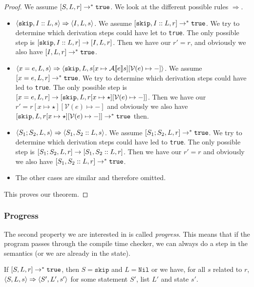 \begin{proof}
We assume $[ S, L, r ] \to ^* \texttt{true}$. We look at the different possible rules $\Rightarrow$. 
\begin{itemize}[noitemsep]
    \item $\langle \texttt{skip}, I::L, s \rangle \Rightarrow \langle I, L, s \rangle$. We assume $[ \texttt{skip}, I::L, r ] \to ^* \texttt{true}$. We try to determine which derivation steps could have let to \texttt{true}. The only possible step is $[ \texttt{skip}, I::L, r ]\to [ I, L, r ]$. Then we have our $r' = r$, and obviously we also have $[ I, L, r ] \to^* \texttt{true}$.
    
    \item $\langle x = e, L, s \rangle \Rightarrow \langle \texttt{skip}, L, s[x \mapsto \mathcal{A} \llbracket e \rrbracket s][\mathcal{V}(e)\mapsto-] \rangle$. We assume $[ x = e, L, r ] \to ^* \texttt{true}$. We try to determine which derivation steps could have led to \texttt{true}. The only possible step is $[ x=e, L, r ] \to [ \texttt{skip}, L, r[x\mapsto \star][\mathcal{V}(e) \mapsto -] ]$. Then we have our $r' = r[x\mapsto \star][\mathcal{V}(e) \mapsto -]$ and obviously we also have $[ \texttt{skip}, L, r[x\mapsto \star][\mathcal{V}(e) \mapsto -] ] \to^* \texttt{true}$ then.
    
    \item $\langle S_1; S_2, L, s \rangle \Rightarrow \langle S_1, S_2::L, s \rangle$. We assume $[ S_1; S_2, L, r ] \to ^* \texttt{true}$. We try to determine which derivation steps could have led to \texttt{true}. The only possible step is $[ S_1; S_2, L, r ] \to [ S_1, S_2::L, r ]$. Then we have our $r' = r$ and obviously we also have $[ S_1, S_2::L, r ] \to^* \texttt{true}$.
    \item The other cases are similar and therefore omitted.
\end{itemize}
This proves our theorem.
\end{proof}

\subsubsection{Progress}
The second property we are interested in is called \emph{progress}. This means that if the program passes through the compile time checker, we can always do a step in the semantics (or we are already in the \sk state). 

\begin{theorem}
\label{progress}
If $[ S, L, r ] \to ^* \texttt{true}$, then $S = \texttt{skip}$ and $L = \texttt{Nil}$ or we have, for all $s$ related to $r$, $\langle S, L, s \rangle \Rightarrow \langle S', L', s' \rangle$ for some statement $S'$, list $L'$ and state $s'$.
\end{theorem}

